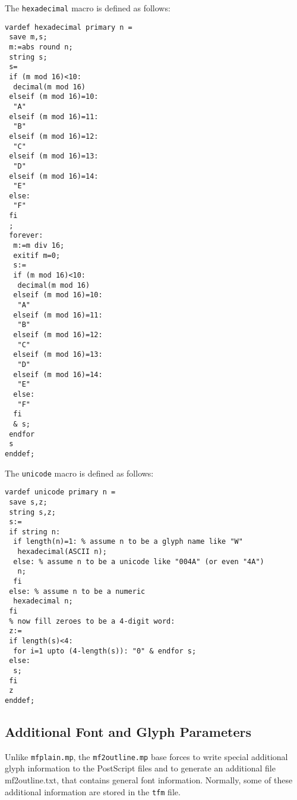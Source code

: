 \documentclass{scrartcl}
\begin{document}
%
The \texttt{hexadecimal} macro is defined as follows:
%
\lstset{language=MetaPost,columns=fullflexible}
\begin{lstlisting}
vardef hexadecimal primary n =
 save m,s;
 m:=abs round n; 
 string s; 
 s=
 if (m mod 16)<10:
  decimal(m mod 16)
 elseif (m mod 16)=10:
  "A"
 elseif (m mod 16)=11:
  "B"
 elseif (m mod 16)=12:
  "C"
 elseif (m mod 16)=13:
  "D"
 elseif (m mod 16)=14:
  "E"
 else:
  "F"
 fi
 ;
 forever:
  m:=m div 16; 
  exitif m=0;
  s:=
  if (m mod 16)<10:
   decimal(m mod 16)
  elseif (m mod 16)=10:
   "A"
  elseif (m mod 16)=11:
   "B"
  elseif (m mod 16)=12:
   "C"
  elseif (m mod 16)=13:
   "D"
  elseif (m mod 16)=14:
   "E"
  else:
   "F"
  fi
  & s; 
 endfor
 s
enddef;
\end{lstlisting}
%
The \texttt{unicode} macro is defined as follows:
%
\lstset{language=MetaPost,columns=fullflexible}
\begin{lstlisting}
vardef unicode primary n = 
 save s,z;
 string s,z;
 s:=
 if string n:
  if length(n)=1: % assume n to be a glyph name like "W"
   hexadecimal(ASCII n);
  else: % assume n to be a unicode like "004A" (or even "4A")
   n;
  fi
 else: % assume n to be a numeric 
  hexadecimal n;
 fi 
 % now fill zeroes to be a 4-digit word:
 z:=
 if length(s)<4:
  for i=1 upto (4-length(s)): "0" & endfor s;
 else:
  s;
 fi
 z
enddef;
\end{lstlisting}
%
\subsection{Additional Font and Glyph Parameters}
%
Unlike \texttt{mfplain.mp}, the \texttt{mf2outline.mp} base forces \MP{} to write special additional glyph information to the PostScript files and to generate an additional file mf2outline.txt, that contains general font information. Normally, some of these additional information are stored in the \texttt{tfm} file.
%
\end{document}
